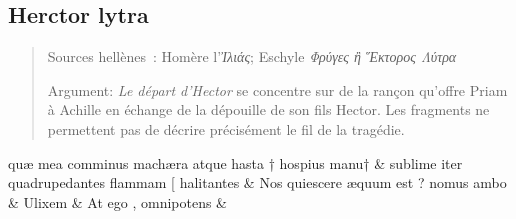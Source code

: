 \documentclass[12pt,onecolumn,twoside,a4paper]{memoir}
\begin{document}
               \subsection*{Herctor lytra}
               \begin{abstract}
                   Sources hellènes : Homère l'\textit{Ἰλιάς}; Eschyle
                        \textit{Φρύγες ἢ Ἕκτορος Λύτρα}
                  \par
                   Argument: \textit{Le départ d'Hector} se concentre sur de la rançon
                     qu’offre Priam à Achille en échange de la dépouille de son fils Hector. Les
                     fragments ne permettent pas de décrire précisément le fil de la tragédie. \par
               \end{abstract}
               \begin{pairs}
                  \begin{Leftside}
			\beginnumbering
			\setcounter{stanzaL}{0}
                     
                         \stanza {}
                     quæ
                              mea
                              comminus
                              machæra
                              atque
                              hasta
                              †
                              hospius
                              manu† \&
                         \stanza {}
                     sublime
                              iter
                              quadrupedantes
                              flammam
                              [
                              halitantes \&
                         \stanza {}Nos
                              quiescere
                              æquum
                              est
                              ?
                              nomus
                              ambo & 
                     Ulixem \&
                         \stanza {}At
                              ego
                              ,
                              omnipotens & 
                     

\end{Leftside}
\end{pairs}
\end{document}
